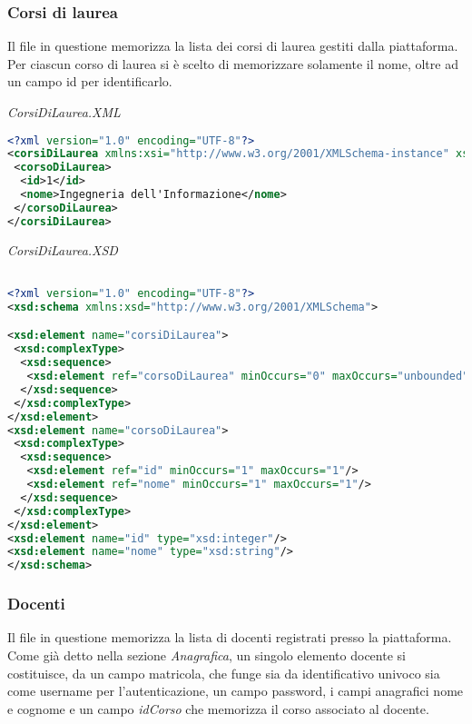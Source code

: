 \documentclass [a4paper,11pt]{book}
\begin{document}
\medskip

\subsubsection{Corsi di laurea}

Il file in questione memorizza la lista dei corsi di laurea gestiti dalla piattaforma. Per ciascun corso di laurea si è scelto di memorizzare solamente il nome, oltre ad un campo id per identificarlo.

\medskip

\emph{CorsiDiLaurea.XML}

\begin{lstlisting}[language=XML]
<?xml version="1.0" encoding="UTF-8"?>
<corsiDiLaurea xmlns:xsi="http://www.w3.org/2001/XMLSchema-instance" xsi:noNamespaceSchemaLocation="corsiDiLaurea.xsd">
 <corsoDiLaurea>
  <id>1</id>
  <nome>Ingegneria dell'Informazione</nome>
 </corsoDiLaurea>
</corsiDiLaurea>
\end{lstlisting}

\medskip

\emph{CorsiDiLaurea.XSD}

\begin{lstlisting}[language=XML]

<?xml version="1.0" encoding="UTF-8"?>
<xsd:schema xmlns:xsd="http://www.w3.org/2001/XMLSchema">

<xsd:element name="corsiDiLaurea">
 <xsd:complexType>
  <xsd:sequence>
   <xsd:element ref="corsoDiLaurea" minOccurs="0" maxOccurs="unbounded" />
  </xsd:sequence>
 </xsd:complexType>
</xsd:element>
<xsd:element name="corsoDiLaurea">
 <xsd:complexType>
  <xsd:sequence>
   <xsd:element ref="id" minOccurs="1" maxOccurs="1"/>
   <xsd:element ref="nome" minOccurs="1" maxOccurs="1"/>
  </xsd:sequence>
 </xsd:complexType>
</xsd:element>
<xsd:element name="id" type="xsd:integer"/>
<xsd:element name="nome" type="xsd:string"/>
</xsd:schema>
\end{lstlisting}

\medskip

\subsubsection{Docenti}

Il file in questione memorizza la lista di docenti registrati presso la piattaforma. Come già detto nella sezione \emph{Anagrafica}, un singolo elemento docente si costituisce, da un campo matricola, che funge sia da identificativo univoco sia come username per l'autenticazione, un campo password, i campi anagrafici nome e cognome e un campo \emph{idCorso} che memorizza il corso associato al docente.
\end{document}
